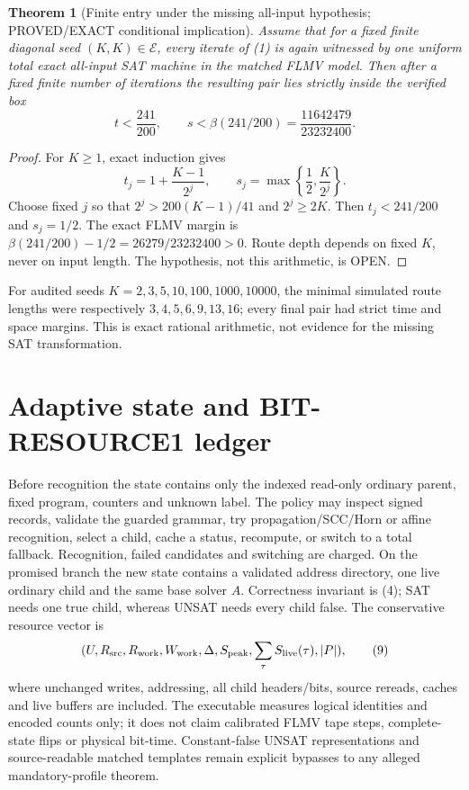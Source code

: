 \documentclass[11pt]{article}
\newtheorem{theorem}{Theorem}
\begin{document}
\begin{theorem}[Finite entry under the missing all-input hypothesis;
PROVED/EXACT conditional implication]
Assume that for a fixed finite diagonal seed $(K,K)\in\mathcal E$, every
iterate of (1) is again witnessed by one uniform total exact all-input SAT
machine in the matched FLMV model.  Then after a fixed finite number of
iterations the resulting pair lies strictly inside the verified box
\[
 t<\frac{241}{200},\qquad
 s<\beta(241/200)=\frac{11642479}{23232400}.                         \tag{7}
\]
\end{theorem}
\begin{proof}
For $K\ge1$, exact induction gives
\[
 t_j=1+\frac{K-1}{2^j},\qquad
 s_j=\max\left\{\frac12,\frac{K}{2^j}\right\}.                     \tag{8}
\]
Choose fixed $j$ so that $2^j>200(K-1)/41$ and $2^j\ge2K$.
Then $t_j<241/200$ and $s_j=1/2$.  The exact FLMV margin is
$\beta(241/200)-1/2=26279/23232400>0$.  Route depth depends on fixed
$K$, never on input length.  The hypothesis, not this arithmetic, is OPEN.
\end{proof}

For audited seeds $K=2,3,5,10,100,1000,10000$, the minimal simulated route
lengths were respectively $3,4,5,6,9,13,16$; every final pair had strict
time and space margins.  This is exact rational arithmetic, not evidence for
the missing SAT transformation.

\section{Adaptive state and BIT-RESOURCE1 ledger}
Before recognition the state contains only the indexed read-only ordinary
parent, fixed program, counters and unknown label.  The policy may inspect
signed records, validate the guarded grammar, try propagation/SCC/Horn or
affine recognition, select a child, cache a status, recompute, or switch to a
total fallback.  Recognition, failed candidates and switching are charged.
On the promised branch the new state contains a validated address directory,
one live ordinary child and the same base solver $A$.  Correctness invariant
is (4); SAT needs one true child, whereas UNSAT needs every child false.
The conservative resource vector is
\[
 (U,R_{\rm src},R_{\rm work},W_{\rm work},\Delta,S_{\rm peak},
   \sum_\tau S_{\rm live}(\tau),|P|),                               \tag{9}
\]
where unchanged writes, addressing, all child headers/bits, source rereads,
caches and live buffers are included.  The executable measures logical
identities and encoded counts only; it does not claim calibrated FLMV tape
steps, complete-state flips or physical bit-time.  Constant-false UNSAT
representations and source-readable matched templates remain explicit
bypasses to any alleged mandatory-profile theorem.
\end{document}
